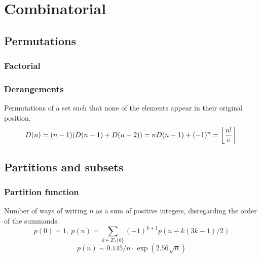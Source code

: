\chapter{Combinatorial}

\section{Permutations}
	\subsection{Factorial}
		


	\subsection{Derangements}
		Permutations of a set such that none of the elements appear in their original position.
		\[ \mkern-2mu D(n) = (n-1)(D(n-1)+D(n-2)) = n D(n-1)+(-1)^n = \left\lfloor\frac{n!}{e}\right\rceil \]



\section{Partitions and subsets}
	\subsection{Partition function}
		Number of ways of writing $n$ as a sum of positive integers, disregarding the order of the summands.
		\[ p(0) = 1,\ p(n) = \sum_{k \in \mathbb Z \setminus \{0\}}{(-1)^{k+1} p(n - k(3k-1) / 2)} \]
		\[ p(n) \sim 0.145 / n \cdot \exp(2.56 \sqrt{n}) \]

